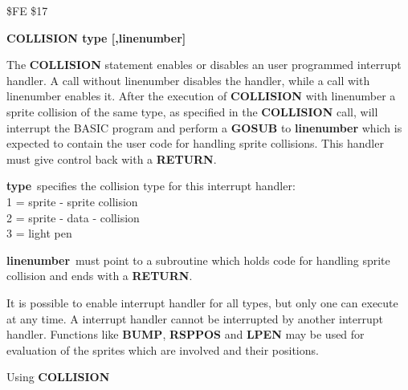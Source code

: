 \begin{description}[leftmargin=3cm,style=nextline]
\item [Token:] \$FE \$17
\item [Format:] {\bf COLLISION type [,linenumber]}
\item [Usage:]  The {\bf COLLISION} statement enables or disables
                an user programmed interrupt handler.
                A call without linenumber disables the handler,
                while a call with linenumber enables it.
                After the execution of {\bf COLLISION} with
                linenumber a sprite collision of the same type,
                as specified in the {\bf COLLISION} call, will
                interrupt the BASIC program and perform a {\bf GOSUB}
                to {\bf linenumber} which is expected to contain
                the user code for handling sprite collisions.
                This handler must give control back with a {\bf RETURN}.

                {\bf type} specifies the collision type for
                this interrupt handler: \\
                1 = sprite - sprite collision \\
                2 = sprite - data - collision \\
                3 = light pen

                {\bf linenumber} must point to a subroutine
                which holds code for handling sprite collision
                and ends with a {\bf RETURN}.

\item [Remarks:] It is possible to enable interrupt handler for
               all types, but only one can execute at any time.
               A interrupt handler cannot be interrupted by another
               interrupt handler.
               Functions like {\bf BUMP}, {\bf RSPPOS} and
               {\bf LPEN} may be used for evaluation of the sprites
               which are involved and their positions.

\item [Example:] Using {\bf COLLISION}
\end{description}

